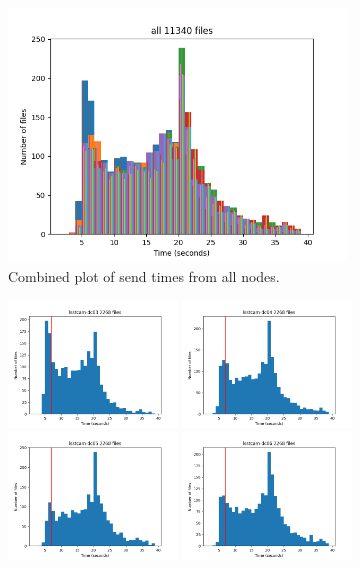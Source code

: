 \begin{figure}
\begin{centering}
\includegraphics[width=0.8\textwidth]{plots/all}
	\caption{Combined plot of send times from all nodes.
\label{fig:summit}}
\end{centering}
\end{figure}


\begin{figure}
\includegraphics[width=0.4\textwidth]{plots/lsstcam-dc03}
\includegraphics[width=0.4\textwidth]{plots/lsstcam-dc04}\\
\includegraphics[width=0.4\textwidth]{plots/lsstcam-dc05}
\includegraphics[width=0.4\textwidth]{plots/lsstcam-dc06}
\end{figure}

